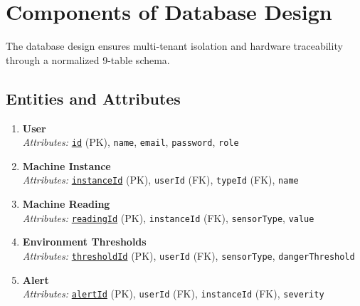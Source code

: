 \documentclass[12pt, a4paper]{article}
\begin{document}
\section{Components of Database Design}
The database design ensures multi-tenant isolation and hardware traceability through a normalized 9-table schema.

\subsection{Entities and Attributes}
\begin{enumerate}
    \item \textbf{User} \\
    \textit{Attributes:} \underline{\texttt{id}} (PK), \texttt{name}, \texttt{email}, \texttt{password}, \texttt{role}

    \item \textbf{Machine Instance} \\
    \textit{Attributes:} \underline{\texttt{instanceId}} (PK), \texttt{userId} (FK), \texttt{typeId} (FK), \texttt{name}

    \item \textbf{Machine Reading} \\
    \textit{Attributes:} \underline{\texttt{readingId}} (PK), \texttt{instanceId} (FK), \texttt{sensorType}, \texttt{value}

    \item \textbf{Environment Thresholds} \\
    \textit{Attributes:} \underline{\texttt{thresholdId}} (PK), \texttt{userId} (FK), \texttt{sensorType}, \texttt{dangerThreshold}

    \item \textbf{Alert} \\
    \textit{Attributes:} \underline{\texttt{alertId}} (PK), \texttt{userId} (FK), \texttt{instanceId} (FK), \texttt{severity}
\end{enumerate}

\end{document}
